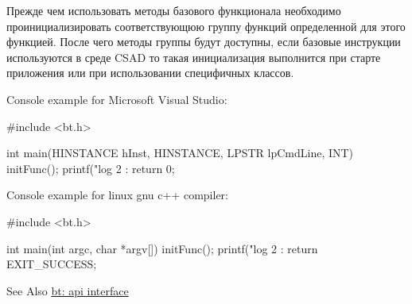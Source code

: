 Прежде чем использовать методы базового функционала необходимо проинициализировать соответствующюю группу функций определенной для этого функцией. После чего методы группы будут доступны, если базовые инструкции используются в среде C\-S\-A\-D то такая инициализация выполнится при старте приложения или при использовании специфичных классов.

Console example for Microsoft Visual Studio\-: \begin{DoxyVerb}  #include <bt.h>

  int main(HINSTANCE hInst, HINSTANCE, LPSTR lpCmdLine, INT)
  {
     initFunc();
     printf("log 2 : %
     return 0;
  }
\end{DoxyVerb}


Console example for linux gnu c++ compiler\-: \begin{DoxyVerb}  #include <bt.h>

  int main(int argc, char *argv[]) {
     initFunc();
     printf("log 2 : %
     return EXIT_SUCCESS;
  }
\end{DoxyVerb}


\begin{DoxySeeAlso}{See Also}
\hyperlink{group__apiinterface}{bt\-: api interface} 
\end{DoxySeeAlso}
